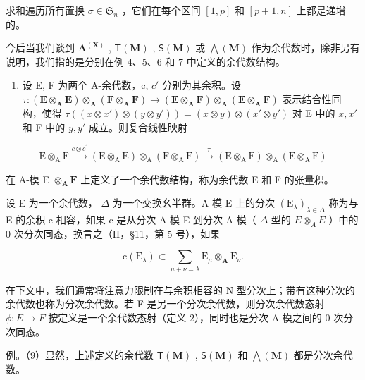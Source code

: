 求和遍历所有置换 \(\sigma\in\mathfrak{S}_{n}\) ，它们在每个区间 \([1,p]\) 和 \([p+1,n]\) 上都是递增的。

今后当我们谈到 \(\mathbf{A}^{(\mathbf{X})}\) , \(\mathsf{T}(\mathbf{M})\) , \(\mathsf{S}(\mathbf{M})\) 或 \(\bigwedge (\mathbf{M})\) 作为余代数时，除非另有说明，我们指的是分别在例 4、5、6 和 7 中定义的余代数结构。

\begin{enumerate}
\def\labelenumi{(\arabic{enumi})}
\setcounter{enumi}{7}
\tightlist
\item
  设 E, F 为两个 A-余代数，c, \(c'\) 分别为其余积。设 \(\tau:(\mathbf{E} \otimes_{\mathbf{A}} \mathbf{E}) \otimes_{\mathbf{A}} (\mathbf{F} \otimes_{\mathbf{A}} \mathbf{F}) \to (\mathbf{E} \otimes_{\mathbf{A}} \mathbf{F}) \otimes_{\mathbf{A}} (\mathbf{E} \otimes_{\mathbf{A}} \mathbf{F})\) 表示结合性同构，使得 \(\tau((x \otimes x') \otimes (y \otimes y')) = (x \otimes y) \otimes (x' \otimes y')\) 对 E 中的 \(x, x'\) 和 F 中的 \(y, y'\) 成立。则复合线性映射
\end{enumerate}

\[
\mathrm{E} \otimes_ {\mathrm{A}} \mathrm{F} \xrightarrow {c \otimes c ^ {\prime}} (\mathrm{E} \otimes_ {\mathrm{A}} \mathrm{E}) \otimes_ {\mathrm{A}} (\mathrm{F} \otimes_ {\mathrm{A}} \mathrm{F}) \xrightarrow {\tau} (\mathrm{E} \otimes_ {\mathrm{A}} \mathrm{F}) \otimes_ {\mathrm{A}} (\mathrm{E} \otimes_ {\mathrm{A}} \mathrm{F})
\]

在 A-模 E \(\otimes_{\mathbf{A}}\mathbf{F}\) 上定义了一个余代数结构，称为余代数 E 和 F 的张量积。

设 E 为一个余代数， \(\Delta\) 为一个交换幺半群。A-模 E 上的分次 \((\mathrm{E}_{\lambda})_{\lambda\in\Delta}\) 称为与 E 的余积 c 相容，如果 c 是从分次 A-模 E 到分次 A-模（ \(\Delta\) 型的 \(E\otimes_{A}E\) ）中的 0 次分次同态，换言之（II，§11，第 5 号），如果

\[
\mathrm{c} (\mathrm{E} _ {\lambda}) \subset \sum_ {\mu + \nu = \lambda} \mathrm{E} _ {\mu} \otimes_ {\mathbf {A}} \mathrm{E} _ {\nu}.\tag{10}
\]

在下文中，我们通常将注意力限制在与余积相容的 N 型分次上；带有这种分次的余代数也称为分次余代数。若 F 是另一个分次余代数，则分次余代数态射 \(\phi:E\to F\) 按定义是一个余代数态射（定义 2），同时也是分次 A-模之间的 0 次分次同态。

例。（9）显然，上述定义的余代数 \(\mathsf{T}(\mathbf{M})\) , \(\mathsf{S}(\mathbf{M})\) 和 \(\bigwedge (\mathbf{M})\) 都是分次余代数。

